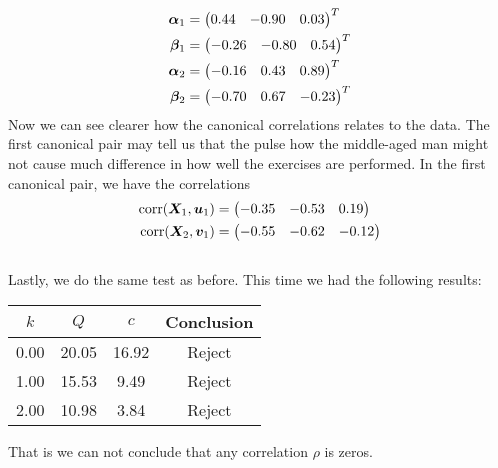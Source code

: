 \begin{align*}
  \bm{\alpha}_{1} &=
                  \begin{pmatrix}
                    0.44 &-0.90 &0.03  
                  \end{pmatrix}^{T} \\
  \bm{\beta}_{1} &=
                 \begin{pmatrix}
                   -0.26 &-0.80 &0.54  
                 \end{pmatrix}^{T} \\
  \bm{\alpha}_{2} &=
                  \begin{pmatrix}
                    -0.16 &0.43 &0.89  
                  \end{pmatrix}^{T} \\
  \bm{\beta}_{2} &=
                 \begin{pmatrix}
                   -0.70 &0.67 &-0.23 
                 \end{pmatrix}^{T}
\end{align*}
Now we can see clearer how the canonical correlations relates to the
data. The first canonical pair may tell us that the pulse how the
middle-aged man might not cause much difference in how well the
exercises are performed. 
 In the first canonical pair, we have the correlations
\begin{align*}
  \text{corr}(\bm{X}_{1}, \bm{u}_{1}) &=
  \begin{pmatrix}
    -0.35 &-0.53 &0.19 
  \end{pmatrix}\\
  \text{corr}(\bm{X}_{2}, \bm{v}_{1}) &=
  \begin{pmatrix}
    -0.55 &-0.62 &-0.12 
  \end{pmatrix}
\end{align*}
\\
Lastly, we do the same test as before. This time we had the following
results:
\begin{center}
\begin{tabular}[h]{c|cc|c}
  $k$ & $Q$ & $c$ & Conclusion \\ \hline
0.00 &20.05 &16.92 & Reject \\ 
1.00 &15.53 &9.49 & Reject\\ 
2.00 &10.98 &3.84  & Reject
\end{tabular}
\end{center}
That is we can not conclude that any correlation $\rho$ is zeros.

